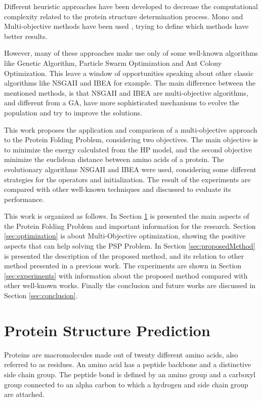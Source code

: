 Different heuristic approaches have been developed to decrease the computational complexity related to the protein structure determination process. Mono and Multi-objective methods have been used \cite{custodio2004investigation, hsu2003growth, krasnogor2002multimeme, lin2011protein, unger1993genetic}, trying to define which methods have better results.


However, many of these approaches make use only of some well-known algorithms like Genetic Algorithm, Particle Swarm Optimization and Ant Colony Optimization. This leave a window of opportunities speaking about other classic algorithms like NSGAII \cite{zitzler1998multiobjective} and IBEA \cite{zitzler2004indicator} for example. The main difference between the mentioned methods, is that NSGAII and IBEA are multi-objective algorithms, and different from a GA, have more sophisticated mechanisms to evolve the population and try to improve the solutions.


This work proposes the application and comparison of a multi-objective approach to the Protein Folding Problem, considering two objectives. The main objective is to minimize the energy calculated from the HP model, and the second objective minimize the euclidean distance between amino acids of a protein. The evolutionary algorithms NSGAII and IBEA were used, considering some different strategies for the operators and initialization. The result of the experiments are compared with other well-known techniques and discussed to evaluate its performance.


This work is organized as follows. In Section \ref{sec:proteinfolding} is presented the main aspects of the Protein Folding Problem and important information for the research. Section \ref{sec:optimization} is about Multi-Objective optimization, showing the positive aspects that can help solving the PSP Problem. In Section \ref{sec:proposedMethod} is presented the description of the proposed method, and its relation to other method presented in a previous work. The experiments are shown in Section \ref{sec:experiments} with information about the proposed method compared with other well-known works. Finally the conclusion and future works are discussed in Section \ref{sec:conclusion}.


\section{Protein Structure Prediction} \label{sec:proteinfolding}


Proteins are macromolecules made out of  twenty different amino acids, also referred to as residues. An amino acid has a peptide backbone and a distinctive side chain group. The peptide bond is defined by an amino group and a carboxyl group connected to an alpha carbon to which  a hydrogen and side chain group are attached.


